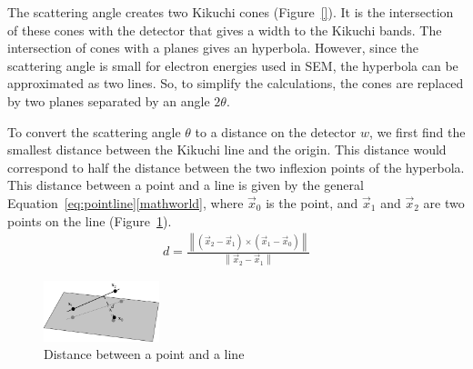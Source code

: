 \documentclass[letterpaper]{article}
\newcommand{\norm}[1]{\left\|#1\right\|}
\begin{document}
	
	The scattering angle creates two Kikuchi cones (Figure~\ref{}). 
	It is the intersection of these cones with the detector that gives a width to the Kikuchi bands.
	The intersection of cones with a planes gives an hyperbola. 
	However, since the scattering angle is small for electron energies used in SEM, the hyperbola can be approximated as two lines. 
	So, to simplify the calculations, the cones are replaced by two planes separated by an angle $2\theta$.
	
	To convert the scattering angle $\theta$ to a distance on the detector $w$, we first find the smallest distance between the Kikuchi line and the origin. 
	This distance would correspond to half the distance between the two inflexion points of the hyperbola.
	This distance between a point and a line is given by the general Equation~\ref{eq:pointline}\ref{mathworld}, where $\vec{x}_0$ is the point, and $\vec{x}_1$ and $\vec{x}_2$ are two points on the line (Figure~\ref{fig:pointline}).
	\begin{eqnarray}
		d = \frac{\norm{(\vec{x}_2-\vec{x}_1) \times (\vec{x}_1-\vec{x}_0)}}{\norm{\vec{x}_2-\vec{x}_1}}
		\label{eq:pointline}
	\end{eqnarray}
	
	\begin{figure}
		\centering
		\includegraphics[width=0.3\textwidth]{figures/pointline}
		\caption{Distance between a point and a line}
		\label{fig:pointline}
	\end{figure}
	
\end{document}
